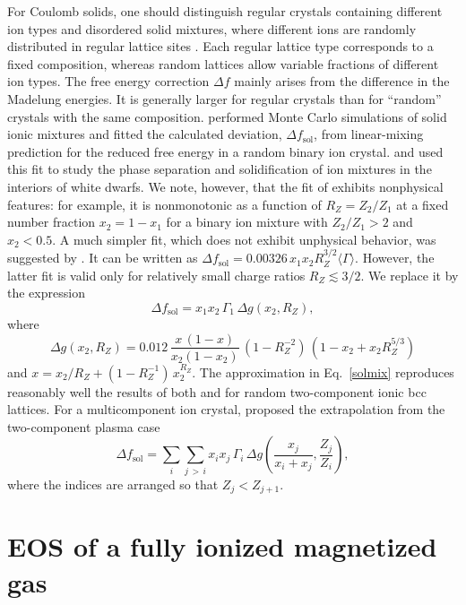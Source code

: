 \documentclass[traditabstract]{aa}
\newcommand{\beq}{\begin{equation}}
\newcommand{\eeq}{\end{equation}}
\newcommand{\req}[1]{Eq.~\ref{#1}}
\begin{document}
For Coulomb solids, one should distinguish regular crystals
containing different ion types and disordered solid
mixtures, where different ions are randomly distributed in
regular lattice sites \citep{Ogata-ea93}. Each regular
lattice type corresponds to a fixed composition, whereas
random lattices allow variable fractions of different ion
types. The free energy correction $\Delta f$ mainly arises
from the difference in the Madelung energies. It is
generally larger for regular crystals than for ``random''
crystals with the same composition. \citet{Ogata-ea93}
performed Monte Carlo simulations of solid ionic mixtures
and fitted the calculated deviation, $\Delta
f_\mathrm{sol}$, from linear-mixing prediction for
the reduced free energy in a random binary ion
crystal. \citet{MedinCumming10} and
\citet{Hughto-ea12} used this fit to study the
phase separation and solidification of ion mixtures in the
interiors of white dwarfs. We note, however, that the fit of
\citet{Ogata-ea93} exhibits nonphysical features: for
example, it is nonmonotonic as a function of $R_Z=Z_2/Z_1$
at a fixed number fraction $x_2=1-x_1$ for a binary ion
mixture with $Z_2/Z_1>2$ and $x_2<0.5$. A much simpler fit,
which does not exhibit unphysical behavior,
was suggested by \citet{DWS03}. It can be written as
$
\Delta f_\mathrm{sol}=0.00326\, x_1x_2 R_Z^{3/2}\langle
\Gamma \rangle.
$
However, the latter fit is
valid only for relatively small charge ratios
$R_Z\lesssim3/2$. 
We replace it by the expression
\beq
   \Delta f_\mathrm{sol} = x_1 x_2\,\Gamma_1\, \Delta g(x_2,R_Z),
\eeq
where
\beq
\Delta g(x_2,R_Z) = 0.012\,\frac{x\,(1-x)}{x_2(1-x_2)}\,
         (1-R_Z^{-2})\,(1-x_2+x_2 R_Z^{5/3})
\label{solmix}
\eeq
and
$   x = x_2/R_Z+(1-R_Z^{-1})\,x_2^{R_Z}.
$
The approximation in \req{solmix} reproduces reasonably well
the results of both \citet{Ogata-ea93} and \citet{DWS03} for
random two-component ionic bcc lattices. For a
multicomponent ion crystal, \citet{MedinCumming10} proposed
the extrapolation from the two-component plasma
case
\beq
   \Delta f_\mathrm{sol} = \sum_i \sum_{j\,>\,i} x_i x_j\,
      \Gamma_i\,
 \Delta g\left(\frac{x_j}{x_i+x_j},\frac{Z_j}{Z_i}\right),
\eeq
where the indices are arranged so that $Z_j < Z_{j+1}$.

\section{EOS of a fully ionized magnetized gas}
\label{sect:mag-id}
\end{document}
